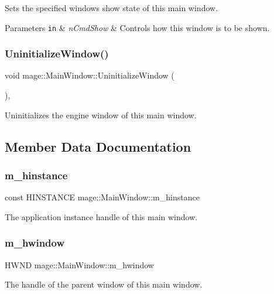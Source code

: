 Sets the specified window\textquotesingle{}s show state of this main window.


\begin{DoxyParams}[1]{Parameters}
\mbox{\tt in}  & {\em n\+Cmd\+Show} & Controls how this window is to be shown. \\
\hline
\end{DoxyParams}
\hypertarget{classmage_1_1_main_window_a229ff4bcc198ed9caf2ce54966caf746}{}\label{classmage_1_1_main_window_a229ff4bcc198ed9caf2ce54966caf746} 
\subsubsection{\texorpdfstring{Uninitialize\+Window()}{UninitializeWindow()}}
{\footnotesize\ttfamily void mage\+::\+Main\+Window\+::\+Uninitialize\+Window (\begin{DoxyParamCaption}{ }\end{DoxyParamCaption})\hspace{0.3cm}{\ttfamily [private]}, {\ttfamily [noexcept]}}

Uninitializes the engine window of this main window. 

\subsection{Member Data Documentation}
\hypertarget{classmage_1_1_main_window_a314759bf324579b568528bbf99bc5c7f}{}\label{classmage_1_1_main_window_a314759bf324579b568528bbf99bc5c7f} 
\subsubsection{\texorpdfstring{m\+\_\+hinstance}{m\_hinstance}}
{\footnotesize\ttfamily const H\+I\+N\+S\+T\+A\+N\+CE mage\+::\+Main\+Window\+::m\+\_\+hinstance\hspace{0.3cm}{\ttfamily [private]}}

The application instance handle of this main window. \hypertarget{classmage_1_1_main_window_afc9afabcf8a52d79f02c8352451863cc}{}\label{classmage_1_1_main_window_afc9afabcf8a52d79f02c8352451863cc} 
\subsubsection{\texorpdfstring{m\+\_\+hwindow}{m\_hwindow}}
{\footnotesize\ttfamily H\+W\+ND mage\+::\+Main\+Window\+::m\+\_\+hwindow\hspace{0.3cm}{\ttfamily [private]}}

The handle of the parent window of this main window. 